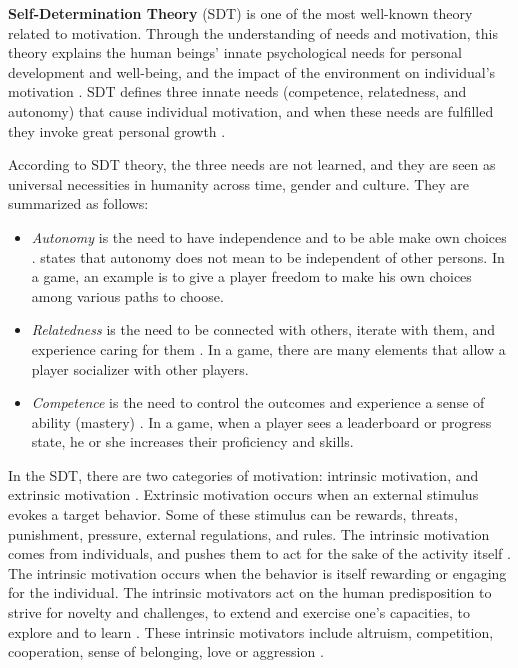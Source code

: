 \textbf{Self-Determination Theory} (SDT) is one of the most well-known theory related to motivation. Through the understanding of needs and motivation, this theory explains the human beings' innate psychological needs for personal development and well-being, and the impact of the environment on individual's motivation \cite{DeciRyan2010,RyanDeci2000}. SDT defines three innate needs (competence, relatedness, and autonomy) that cause individual motivation, and when these needs are fulfilled they invoke great personal growth \cite{ArazyGellatly2012}.

According to SDT theory, the three needs are not learned, and they are seen as universal necessities in humanity across time, gender and culture. They are summarized as follows:
\begin{itemize}
\item \emph{Autonomy} is the need to have independence and to be able make own choices \cite{DeciRyan2010}.  states that autonomy does not mean to be independent of other persons. In a game, an example is to give a player freedom to make his own choices among various paths to choose.
\item \emph{Relatedness} is the need to be connected with others, iterate with them, and experience caring for them \cite{BaumeisterLeary1995}. In a game, there are many elements that allow a player socializer with other players.
\item \emph{Competence} is the need to control the outcomes and experience a sense of ability (mastery) \cite{White1959}. In a game, when a player sees a leaderboard or progress state, he or she increases their proficiency and skills.
\end{itemize}

In the SDT, there are two categories of motivation: intrinsic motivation, and extrinsic motivation \cite{DeciVansteenkiste2004}. Extrinsic motivation occurs when an external stimulus evokes a target behavior. Some of these stimulus can be rewards, threats, punishment, pressure, external regulations, and rules. The intrinsic motivation comes from individuals, and pushes them to act for the sake of the activity itself \cite{DeciRyan2010}. The intrinsic motivation occurs when the behavior is itself rewarding or engaging for the individual. The intrinsic motivators act on the human predisposition to strive for novelty and challenges, to extend and exercise one's capacities, to explore and to learn \cite{RyanDeci2000}. These intrinsic motivators include altruism, competition, cooperation, sense of belonging, love or aggression \cite{Muntean2011}.

